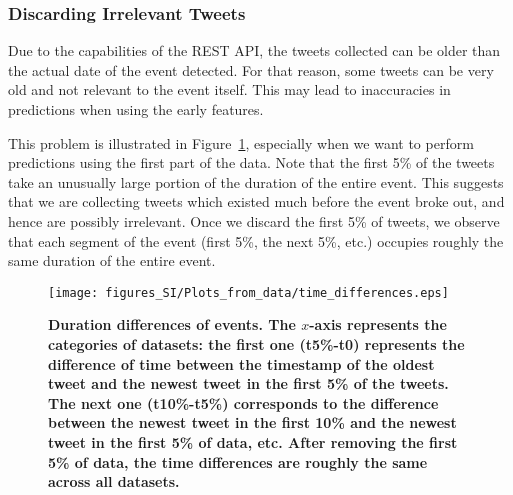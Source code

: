 \subsubsection{Discarding Irrelevant Tweets}
\label{subsubsec:discarding_irrelevant_tweets}

Due to the capabilities of the REST API, the tweets collected can be
older than the actual date of the event detected. For that reason,
some tweets can be very old and not relevant to the event itself. This
may lead to inaccuracies in predictions when using the early features.

This problem is illustrated in Figure~\ref{fig:duration-differences},
especially when we want to perform predictions using the first part of
the data. Note that the first 5\% of the tweets take an unusually
large portion of the duration of the entire event. This suggests that
we are collecting tweets which existed much before the event broke
out, and hence are possibly irrelevant. Once we discard the first 5\%
of tweets, we observe that each segment of the event (first 5\%, the
next 5\%, etc.) occupies roughly the same duration of the entire event.

\begin{figure}
  \centering
  \texttt{[image: figures\_SI/Plots\_from\_data/time\_differences.eps]}
  \caption[Duration differences of events.]{\textbf{Duration
      differences of events. The $x$-axis represents the categories of
      datasets: the first one (t5\%-t0) represents the difference of
      time between the timestamp of the oldest tweet and the newest
      tweet in the first 5\% of the tweets. The next one (t10\%-t5\%)
      corresponds to the difference between the newest tweet in the
      first 10\% and the newest tweet in the first 5\% of data, etc.
      After removing the first 5\% of data, the time differences are
      roughly the same across all datasets.
    }}\label{fig:duration-differences}

\end{figure}


